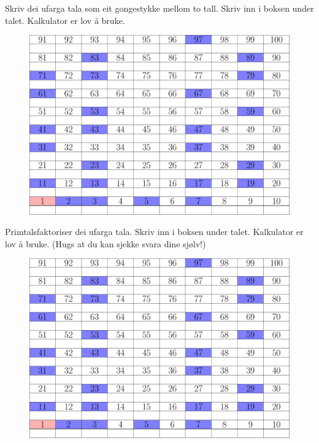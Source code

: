 
\usepackage[T1]{fontenc}
\usepackage[utf8]{luainputenc}
\usepackage{lmodern} %
\usepackage{geometry}
\geometry{verbose,a4paper, landscape, inner=2.3cm, outer=1.8 cm, bmargin=1cm, tmargin=1cm}
\setlength{\parindent}{0bp}
\usepackage{import}
\usepackage[subpreambles=false]{standalone}
\usepackage{amsmath}
\usepackage{amssymb}
\usepackage{esint}
\usepackage{babel}
\usepackage{tabu}
\usepackage[dvipsnames, table]{xcolor}
\makeatother
\makeatletter



\pagestyle{empty}
Skriv dei ufarga tala som eit gongestykke mellom to tall. Skriv inn i boksen under talet. Kalkulator er lov å bruke.
\begin{figure}
	\centering
	\includegraphics{fakttil100opg}
\end{figure} 
\newpage
\pagestyle{empty}
Primtalsfaktoriser dei ufarga tala. Skriv inn i boksen under talet. Kalkulator er lov å bruke. (Hugs at du kan sjekke svara dine sjølv!)
\begin{figure}
	\centering
	\includegraphics{fakttil100opg}
\end{figure} 

